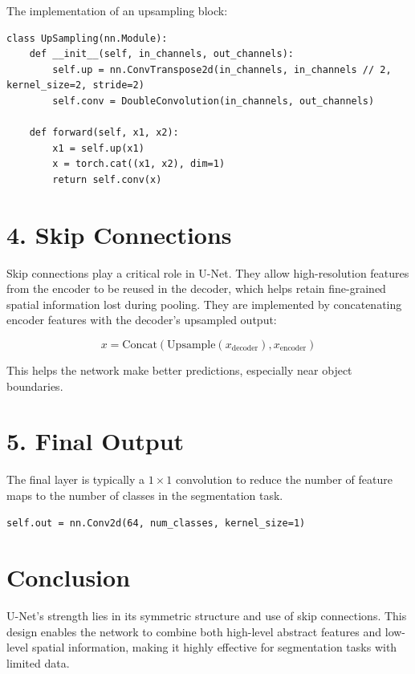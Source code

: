\documentclass{article}
\begin{document}
The implementation of an upsampling block:

\begin{verbatim}
class UpSampling(nn.Module):
    def __init__(self, in_channels, out_channels):
        self.up = nn.ConvTranspose2d(in_channels, in_channels // 2, kernel_size=2, stride=2)
        self.conv = DoubleConvolution(in_channels, out_channels)

    def forward(self, x1, x2):
        x1 = self.up(x1)
        x = torch.cat((x1, x2), dim=1)
        return self.conv(x)
\end{verbatim}

\section*{4. Skip Connections}

Skip connections play a critical role in U-Net. They allow high-resolution features from the encoder to be reused in the decoder, which helps retain fine-grained spatial information lost during pooling. They are implemented by concatenating encoder features with the decoder's upsampled output:

\begin{equation}
x = \text{Concat}(\text{Upsample}(x_{\text{decoder}}), x_{\text{encoder}})
\end{equation}

This helps the network make better predictions, especially near object boundaries.

\section*{5. Final Output}

The final layer is typically a $1 \times 1$ convolution to reduce the number of feature maps to the number of classes in the segmentation task.

\begin{verbatim}
self.out = nn.Conv2d(64, num_classes, kernel_size=1)
\end{verbatim}

\section*{Conclusion}

U-Net's strength lies in its symmetric structure and use of skip connections. This design enables the network to combine both high-level abstract features and low-level spatial information, making it highly effective for segmentation tasks with limited data.
\end{document}
